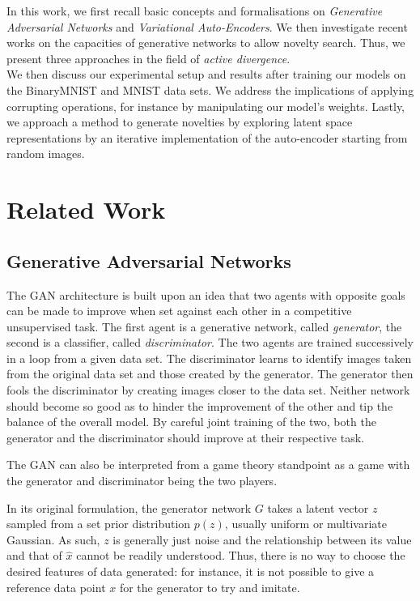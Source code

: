 \documentclass{article}
\begin{document}
In this work, we first recall basic concepts and formalisations on \emph{Generative Adversarial Networks} and \emph{Variational Auto-Encoders}. We then investigate recent works on the capacities of generative networks to allow novelty search. Thus, we present three approaches in the field of \emph{active divergence}. \\
We then discuss our experimental setup and results after training our models on the BinaryMNIST and MNIST data sets.
We address the implications of applying corrupting operations, for instance by manipulating our model's weights.
Lastly, we approach a method to generate novelties by exploring latent space representations by an iterative implementation of the auto-encoder starting from random images.



\section{Related Work}
\label{sec:related_work}

\subsection{Generative Adversarial Networks}
\label{subsec:gan}

The GAN 
\cite{goodfellowGenerativeAdversarialNetworks2020} architecture is built upon an idea that 
two agents with opposite goals can
be made to improve when set against each other in a competitive unsupervised task.
The first agent is a generative network, called \emph{generator},
the second is a classifier, called \emph{discriminator}.
The two agents are trained successively in a loop from a given data set.
The discriminator learns to identify images taken from the original data set and those created by the generator.
The generator then fools the discriminator by creating images closer to the data set.
Neither network should become 
so good as to hinder the improvement of the other and tip the balance of the overall model.
By careful joint training of the two,
both the generator and the discriminator should improve at their respective task.

The GAN can also be interpreted from a game theory standpoint as a game with the 
generator and discriminator being the two players.

In its original formulation, the generator network $G$ takes a latent vector $z$ sampled 
from a set prior distribution $p(z)$, usually uniform or multivariate Gaussian.
As such, $z$ is generally just noise and the relationship between its value and 
that of $\hat{x}$ cannot be readily understood. Thus, there is no way to choose the desired 
features of data generated: for instance, it is not possible to give a reference 
data point $x$ for the generator to try and imitate.
\end{document}
